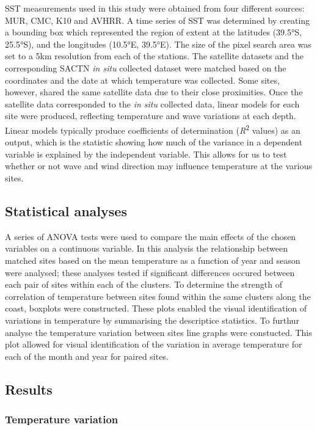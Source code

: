 \documentclass[12pt,A4paper,]{article}
\begin{document}
SST measurements used in this study were obtained from four different
sources: MUR, CMC, K10 and AVHRR. A time series of SST was determined by
creating a bounding box which represented the region of extent at the
latitudes (39.5°S, 25.5°S), and the longitudes (10.5°E, 39.5°E). The
size of the pixel search area was set to a 5km resolution from each of
the stations. The satellite datasets and the corresponding SACTN
\emph{in situ} collected dataset were matched based on the coordinates
and the date at which temperature was collected. Some sites, however,
shared the same satellite data due to their close proximities. Once the
satellite data corresponded to the \emph{in situ} collected data, linear
models for each site were produced, reflecting temperature and wave
variations at each depth. Linear models typically produce coefficients
of determination (\emph{R}\textsuperscript{2} values) as an output,
which is the statistic showing how much of the variance in a dependent
variable is explained by the independent variable. This allows for us to
test whether or not wave and wind direction may influence temperature at
the various sites.

\subsection{Statistical analyses}\label{statistical-analyses}

A series of ANOVA tests were used to compare the main effects of the
chosen variables on a continuous variable. In this analysis the
relationship between matched sites based on the mean temperature as a
function of year and season were analysed; these analyses tested if
significant differences occured between each pair of sites within each
of the clusters. To determine the strength of correlation of temperature
between sites found within the same clusters along the coast, boxplots
were constructed. These plots enabled the visual identification of
variations in temperature by summarising the descriptice statistics. To
furthur analyse the temperature variation between sites line graphs were
constucted. This plot allowed for visual identification of the variation
in average temperature for each of the month and year for paired sites.

\subsection{Results}\label{results}

\subsubsection{Temperature variation}\label{temperature-variation}
\end{document}
